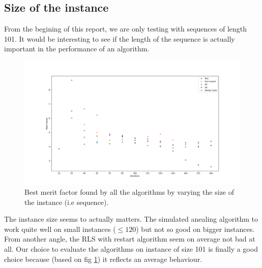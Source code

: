 \documentclass[a4paper,11pt,openany]{article}
\begin{document}
\subsection{Size of the instance}
From the begining of this report, we are only testing with sequences of length 101. It would be interesting to see if the length of the sequence is actually important in the performance of an algorithm.
\begin{figure}[H]
\begin{center}
\includegraphics[scale=0.26]{Images/instance_size}
\caption{Best merit factor found by all the algorithms by varying the size of the instance (i.e sequence).}
\label{fig:instance_size}
\end{center}
\end{figure}
\noindent
The instance size seems to actually matters. The simulated anealing algorithm to work quite well on small instances ($\leq 120$) but not so good on bigger instances.  From another angle, the RLS with restart algorithm seem on average not bad at all. Our choice to evaluate the algorithms on instance of size 101 is finally a good choice because (based on fig \ref{fig:instance_size}) it reflects an average behaviour.
\end{document}

